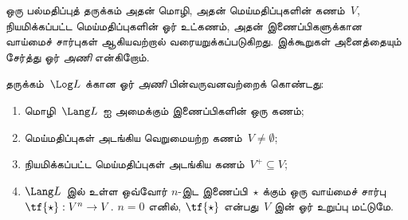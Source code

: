 \documentclass[../../../include/open-logic-section]{subfiles}
\begin{document}


ஒரு பல்மதிப்புத் தருக்கம் அதன் மொழி, அதன் மெய்மதிப்புகளின் கணம்~$V$,
நியமிக்கப்பட்ட மெய்மதிப்புகளின் ஓர் உட்கணம், அதன் இணைப்பிகளுக்கான வாய்மைச்
சார்புகள் ஆகியவற்றால் வரையறுக்கப்படுகிறது. இக்கூறுகள் அனைத்தையும் சேர்த்து
ஓர் \emph{அணி} என்கிறோம்.

\begin{defn}[அணி]
தருக்கம்~$\Log L$ க்கான ஓர் \emph{அணி} பின்வருவனவற்றைக் கொண்டது:
\begin{enumerate}
\item மொழி~$\Lang L$ ஐ அமைக்கும் இணைப்பிகளின் ஒரு கணம்;
\item மெய்மதிப்புகள் அடங்கிய வெறுமையற்ற கணம்~$V \neq \emptyset$;
\item நியமிக்கப்பட்ட மெய்மதிப்புகள் அடங்கிய கணம்~$V^+ \subseteq V$;
\item $\Lang L$ இல் உள்ள ஒவ்வோர் $n$-இட இணைப்பி~$\star$ க்கும் ஒரு
வாய்மைச் சார்பு~$\tf{\star} : V^n \to V$. $n = 0$ எனில்,
$\tf{\star}$ என்பது~$V$ இன் ஓர் உறுப்பு மட்டுமே.
\end{enumerate}
\end{defn}
\end{document}
